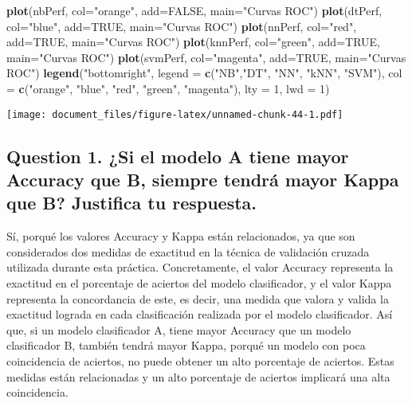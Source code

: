 \documentclass[]{article}
\newenvironment{Shaded}{\begin{snugshade}}{\end{snugshade}}
\newcommand{\DataTypeTok}[1]{\textcolor[rgb]{0.13,0.29,0.53}{#1}}
\newcommand{\DecValTok}[1]{\textcolor[rgb]{0.00,0.00,0.81}{#1}}
\newcommand{\KeywordTok}[1]{\textcolor[rgb]{0.13,0.29,0.53}{\textbf{#1}}}
\newcommand{\NormalTok}[1]{#1}
\newcommand{\OtherTok}[1]{\textcolor[rgb]{0.56,0.35,0.01}{#1}}
\newcommand{\StringTok}[1]{\textcolor[rgb]{0.31,0.60,0.02}{#1}}
\begin{document}
\begin{Shaded}
\begin{Highlighting}[]
\KeywordTok{plot}\NormalTok{(nbPerf, }\DataTypeTok{col=}\StringTok{"orange"}\NormalTok{, }\DataTypeTok{add=}\OtherTok{FALSE}\NormalTok{, }\DataTypeTok{main=}\StringTok{"Curvas ROC"}\NormalTok{)}
\KeywordTok{plot}\NormalTok{(dtPerf, }\DataTypeTok{col=}\StringTok{"blue"}\NormalTok{, }\DataTypeTok{add=}\OtherTok{TRUE}\NormalTok{, }\DataTypeTok{main=}\StringTok{"Curvas ROC"}\NormalTok{)}
\KeywordTok{plot}\NormalTok{(nnPerf, }\DataTypeTok{col=}\StringTok{"red"}\NormalTok{, }\DataTypeTok{add=}\OtherTok{TRUE}\NormalTok{, }\DataTypeTok{main=}\StringTok{"Curvas ROC"}\NormalTok{)}
\KeywordTok{plot}\NormalTok{(knnPerf, }\DataTypeTok{col=}\StringTok{"green"}\NormalTok{, }\DataTypeTok{add=}\OtherTok{TRUE}\NormalTok{, }\DataTypeTok{main=}\StringTok{"Curvas ROC"}\NormalTok{)}
\KeywordTok{plot}\NormalTok{(svmPerf, }\DataTypeTok{col=}\StringTok{"magenta"}\NormalTok{, }\DataTypeTok{add=}\OtherTok{TRUE}\NormalTok{, }\DataTypeTok{main=}\StringTok{"Curvas ROC"}\NormalTok{)}
\KeywordTok{legend}\NormalTok{(}\StringTok{"bottomright"}\NormalTok{, }
       \DataTypeTok{legend =} \KeywordTok{c}\NormalTok{(}\StringTok{"NB"}\NormalTok{,}\StringTok{"DT"}\NormalTok{, }\StringTok{"NN"}\NormalTok{, }\StringTok{"kNN"}\NormalTok{, }\StringTok{"SVM"}\NormalTok{), }
       \DataTypeTok{col =} \KeywordTok{c}\NormalTok{(}\StringTok{"orange"}\NormalTok{, }\StringTok{"blue"}\NormalTok{, }\StringTok{"red"}\NormalTok{, }\StringTok{"green"}\NormalTok{, }\StringTok{"magenta"}\NormalTok{), }
       \DataTypeTok{lty =} \DecValTok{1}\NormalTok{, }\DataTypeTok{lwd =} \DecValTok{1}\NormalTok{)}
\end{Highlighting}
\end{Shaded}

\texttt{[image: document\_files/figure-latex/unnamed-chunk-44-1.pdf]}

\hypertarget{question-1}{%
	\subsection{Question 1. ¿Si el modelo A tiene mayor Accuracy que B, siempre tendrá mayor Kappa que B? Justifica tu respuesta.}\label{question-1}}

Sí, porqué los valores Accuracy y Kappa están relacionados, ya que son considerados dos medidas de exactitud en la técnica de validación cruzada utilizada durante esta práctica. Concretamente, el valor Accuracy representa la exactitud en el porcentaje de aciertos del modelo clasificador, y el valor Kappa representa la concordancia de este, es decir, una medida que valora y valida la exactitud lograda en cada clasificación realizada por el modelo clasificador. Así que, si un modelo clasificador A, tiene mayor Accuracy que un modelo clasificador B, también tendrá mayor Kappa, porqué un modelo con poca coincidencia de aciertos, no puede obtener un alto porcentaje de aciertos. Estas medidas están relacionadas y un alto porcentaje de aciertos implicará una alta coincidencia.
\end{document}
